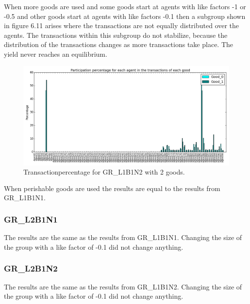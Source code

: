 \documentclass[twoside,openright]{uva-bachelor-thesis}
\begin{document}
When more goods are used and some goods start at agents with like factors -1 or -0.5 and other goods start at agents with like factors -0.1 then a subgroup shown in figure 6.11 arises where the transactions are not equally distributed over the agents. The transactions within this subgroup do not stabilize, because the distribution of the transactions changes as more transactions take place. The yield never reaches an equilibrium. \\
\begin{figure}[h!]
  \centering
\includegraphics[scale=0.4]{Simulation_figures/GR_L1B1N2/2goods_spikes}
  \caption{Transactionpercentage for GR\_L1B1N2 with 2 goods.}
\end{figure}

When perishable goods are used the results are equal to the results from GR\_L1B1N1.
\subsubsection{GR\_L2B1N1}
The results are the same as the results from GR\_L1B1N1. Changing the size of the group with a like factor of -0.1 did not change anything. 
\subsubsection{GR\_L2B1N2}
The results are the same as the results from GR\_L1B1N2. Changing the size of the group with a like factor of -0.1 did not change anything. 

\clearpage
\end{document}
